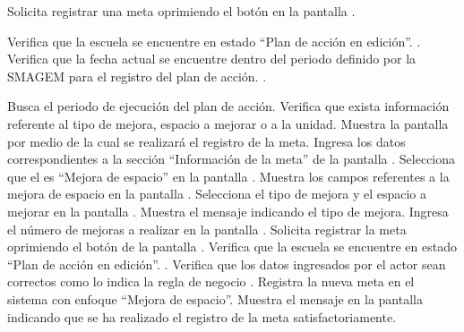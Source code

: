  
\begin{UCtrayectoria}
	\UCpaso[\UCactor] Solicita registrar una meta oprimiendo el botón  en la pantalla .
	
		\UCpaso[\UCsist] Verifica que la escuela se encuentre en  estado ``Plan de acción en edición''. .
    \UCpaso[\UCsist] Verifica que la fecha actual se encuentre dentro del periodo definido por la SMAGEM para el registro del plan de acción. .
    
	\UCpaso[\UCsist] Busca el periodo de ejecución del plan de acción.
	\UCpaso[\UCsist] Verifica que exista información referente al tipo de mejora, espacio a mejorar o a la unidad. 
	\UCpaso[\UCsist] Muestra la pantalla  por medio de la cual se realizará el registro de la meta.
	\UCpaso[\UCactor] Ingresa los datos correspondientes a la sección ``Información de la meta'' de la pantalla . \label{cupae1:ingresaDatos}
	\UCpaso[\UCactor] Selecciona que el  es ``Mejora de espacio'' en la pantalla . 
	\UCpaso[\UCsist] Muestra los campos referentes a la mejora de espacio en la pantalla .
	\UCpaso[\UCactor] Selecciona el tipo de mejora y el espacio a mejorar en la pantalla .
	\UCpaso[\UCsist] Muestra el mensaje  indicando el tipo de mejora.
	\UCpaso[\UCactor] Ingresa el número de mejoras a realizar en la pantalla .
	\UCpaso[\UCactor] Solicita registrar la meta oprimiendo el botón  de la pantalla . 
		\UCpaso[\UCsist] Verifica que la escuela se encuentre en  estado ``Plan de acción en edición''. .
	\UCpaso[\UCsist] Verifica que los datos ingresados por el actor sean correctos como lo indica la regla de negocio .   
	\UCpaso[\UCsist] Registra la nueva meta en el sistema con enfoque ``Mejora de espacio''.
	\UCpaso[\UCsist] Muestra el mensaje  en la pantalla  indicando que se ha realizado el registro de la meta satisfactoriamente. \label{cupae1:muestraMensaje}
\end{UCtrayectoria}

